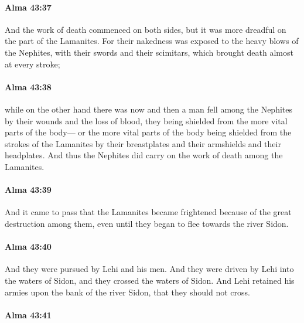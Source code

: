 		\paragraph{Alma 43:37} %
			\label{ALMA-43-37}

			And the work of death commenced on both sides,
			but it was more dreadful on the part of the Lamanites.
			For their nakedness was exposed to the heavy blows of the Nephites,
			with their swords and their scimitars,
			which brought death almost at every stroke;

		\paragraph{Alma 43:38} %
			\label{ALMA-43-38}

			while on the other hand
			there was now and then a man fell among the Nephites
			by their wounds and the loss of blood,
			they being shielded from the more vital parts of the body---
			or the more vital parts of the body being shielded
			from the strokes of the Lamanites
			by their breastplates and their armshields and their headplates.
			And thus the Nephites did carry on the work of death among the Lamanites.

		\paragraph{Alma 43:39} %
			\label{ALMA-43-39}

			And it came to pass that the Lamanites became frightened
			because of the great destruction among them,
			even until they began to flee towards the river Sidon.

		\paragraph{Alma 43:40} %
			\label{ALMA-43-40}

			And they were pursued by Lehi and his men.
			And they were driven by Lehi into the waters of Sidon,
			and they crossed the waters of Sidon.
			And Lehi retained his armies upon the bank of the river Sidon,
			that they should not cross.

		\paragraph{Alma 43:41} %
			\label{ALMA-43-41}

